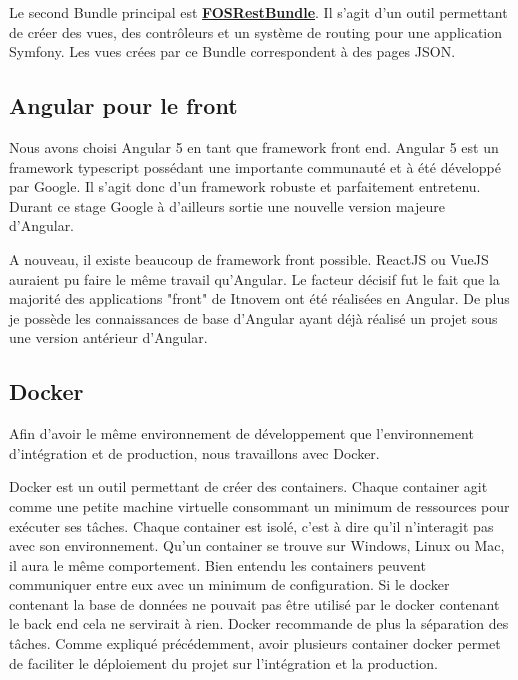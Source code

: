 \documentclass[12pt, twoside, openright]{report}
\begin{document}
Le second Bundle principal est \href{https://symfony.com/doc/current/bundles/FOSRestBundle/index.html}{\textbf{FOSRestBundle}}. Il s'agit d'un outil permettant de créer des vues, des contrôleurs et un système de routing pour une application Symfony. Les vues crées par ce Bundle correspondent à des pages JSON. 

\subsection{Angular pour le front}

Nous avons choisi Angular 5 en tant que framework front end. Angular 5 est un framework typescript possédant une importante communauté et à été développé par Google. Il s'agit donc d'un framework robuste et parfaitement entretenu. Durant ce stage Google à d’ailleurs sortie une nouvelle version majeure d'Angular. 

A nouveau, il existe beaucoup de framework front possible. ReactJS ou VueJS auraient pu faire le même travail qu'Angular. Le facteur décisif fut le fait que la majorité des applications "front" de Itnovem ont été réalisées en Angular. De plus je possède les connaissances de base d'Angular ayant déjà réalisé un projet sous une version antérieur d'Angular. 

\subsection{Docker}

Afin d'avoir le même environnement de développement que l’environnement d'intégration et de production, nous travaillons avec Docker.

Docker est un outil permettant de créer des containers. Chaque container agit comme une petite machine virtuelle consommant un minimum de ressources pour exécuter ses tâches. Chaque container est isolé, c'est à dire qu'il n’interagit pas avec son environnement. Qu'un container se trouve sur Windows, Linux ou Mac, il aura le même comportement. Bien entendu les containers peuvent communiquer entre eux avec un minimum de configuration. Si le docker contenant la base de données ne pouvait pas être utilisé par le docker contenant le back end cela ne servirait à rien. Docker recommande de plus la séparation des tâches. Comme expliqué précédemment, avoir plusieurs container docker permet de faciliter le déploiement du projet sur l'intégration et la production.  
\end{document}
